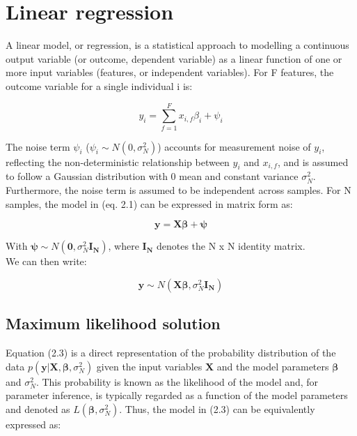 
\section{Linear regression} 

A linear model, or regression, is a statistical approach to modelling a continuous output variable (or outcome, dependent variable) as a linear function of one or more input variables (features, or independent variables). For F features, the outcome variable for a single individual i is:

\begin{equation} \label{eq1:Linear_regression_sample_i}
 y_i = \sum_{f=1}^{F} x_{i,f}\beta_i + \psi_i
\end{equation}

The noise term $\psi_i$ ($ \psi_i \sim N(0, \sigma_N^2)$) accounts for measurement noise of $y_i$, reflecting the non-deterministic relationship between $y_i$ and $x_{i,f}$, and is assumed to follow a Gaussian distribution with 0 mean and constant variance $\sigma_N^2$. Furthermore, the noise term is assumed to be independent across samples. For N samples, the model in (eq. 2.1) can be expressed in matrix form as:

\begin{equation} \label{eq2:Linear_regression_matrix_form}
\mathbf{y} = \mathbf{X}\boldsymbol{\beta} + \boldsymbol{\psi} 
\end{equation}

With $ \boldsymbol{\psi} \sim N(\mathbf{0}, \sigma_N^2 \mathbf{I_N})$, where $\mathbf{I_N}$ denotes the N x N identity matrix. \\ 

We can then write:

\begin{equation} \label{eq3:Linear_regression_MVN_form}
\mathbf{y} \sim N(\mathbf{X}\boldsymbol{\beta}, \sigma_N^2 \mathbf{I_N}) 
\end{equation}

\newpage

\subsection{Maximum likelihood solution}

Equation (2.3) is a direct representation of the probability distribution of the data $p(\mathbf{y}| \mathbf{X}, \boldsymbol{\beta}, \sigma_N^2)$ given the input variables $\mathbf{X}$ and the model parameters $\boldsymbol{\beta}$ and $\sigma_N^2$.
This probability is known as the likelihood of the model and, for parameter inference, is typically regarded as a function of the model parameters and denoted as $L(\boldsymbol{\beta}, \sigma_N^2)$. 
Thus, the model in (2.3) can be equivalently expressed as:\\

